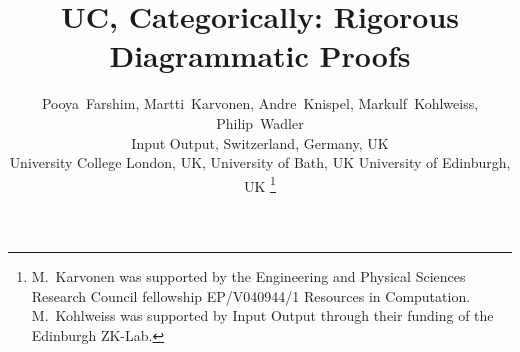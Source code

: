 \documentclass[conference]{IEEEtran}
\begin{document}
\title{
UC, Categorically: Rigorous Diagrammatic Proofs
}
\author{
Pooya~Farshim, 
Martti~Karvonen,
Andre~Knispel, 
Markulf~Kohlweiss, 
Philip~Wadler\\
Input Output,
Switzerland,
Germany,
UK \\
University College London, UK,
University of Bath, UK
University of Edinburgh, UK
\thanks{M.~Karvonen was supported by the Engineering and Physical Sciences Research Council fellowship EP/V040944/1 Resources in Computation. M.~Kohlweiss was supported by Input Output through their funding of the Edinburgh ZK-Lab.}
}
\maketitle










\appendices

\end{document}
